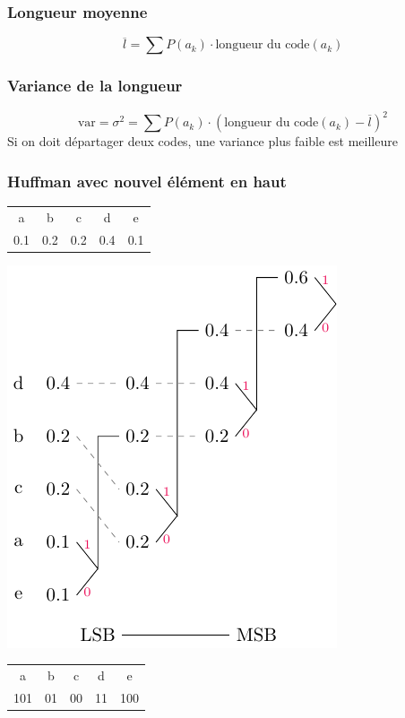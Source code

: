 \documentclass[resume]{subfiles}
\begin{document}
\subsubsection{Longueur moyenne}
$$\overline{l}=\sum P(a_k)\cdot \text{longueur du code}(a_k)$$
\subsubsection{Variance de la longueur}
$$\text{var}=\sigma^2=\sum P(a_k)\cdot \left(\text{longueur du code}(a_k)-\overline{l}\right)^2$$
Si on doit départager deux codes, une variance plus faible est meilleure
\subsubsection{Huffman avec nouvel élément en haut}
\begin{center}
\begin{tabular}{ccccc}
a & b & c & d & e\\
0.1 & 0.2 & 0.2 & 0.4 & 0.1
\end{tabular}
\end{center}
\begin{center}
\includegraphics[scale=0.75,page=1]{drwg_4.pdf}
\\
\begin{tabular}{ccccc}
a & b & c & d & e\\
101 & 01 & 00 & 11 & 100
\end{tabular}
\end{center}
\end{document}
